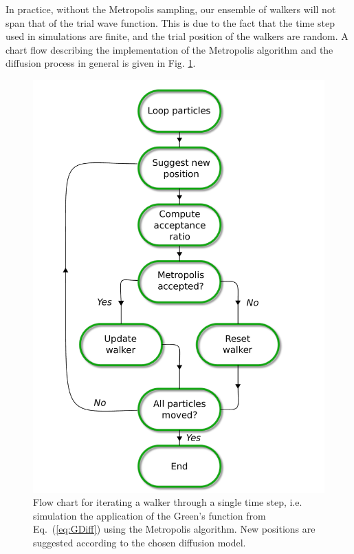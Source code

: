 In practice, without the Metropolis sampling, our ensemble of walkers will not span that of the trial wave function. This is due to the fact that the time step used in simulations are finite, and the trial position of the walkers are random. A chart flow describing the implementation of the Metropolis algorithm and the diffusion process in general is given in Fig. \ref{fig:diffFlowChart}.

\begin{figure}
 \begin{center}
  \includegraphics[scale=0.65]{../Graphics/DiffusionUML.pdf}
  \caption{Flow chart for iterating a walker through a single time step, i.e. simulation the application of the Green's function from Eq.~(\ref{eq:GDiff}) using the Metropolis algorithm. New positions are suggested according to the chosen diffusion model.}
  \label{fig:diffFlowChart}
 \end{center}
\end{figure}
\clearpage




